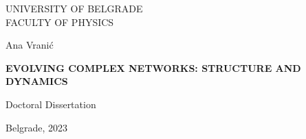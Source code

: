 \thispagestyle{empty}
\centering

\Large{
    UNIVERSITY OF BELGRADE \\
    FACULTY OF PHYSICS
}

\vspace{5.5cm}

\Large{
    Ana Vrani\' c
}

\vspace{.5cm}


\textbf{\LARGE 
  { EVOLVING COMPLEX NETWORKS: STRUCTURE AND DYNAMICS}
  }

\vspace{.5cm}

\Large{
    Doctoral Dissertation }

    \vspace{9.1cm}

\Large{
    Belgrade, 2023
}

\pagebreak
\justify
\thispagestyle{empty}

